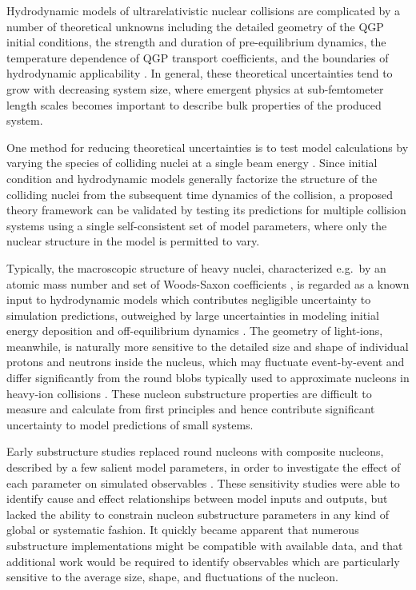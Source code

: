 \documentclass[aps,prc,reprint,amsmath,nofootinbib]{revtex4-1}
\begin{document}
Hydrodynamic models of ultrarelativistic nuclear collisions are complicated by a number of theoretical unknowns including the detailed geometry of the QGP initial conditions, the strength and duration of pre-equilibrium dynamics, the temperature dependence of QGP transport coefficients, and the boundaries of hydrodynamic applicability \cite{Niemi:2014lha, deSouza:2015ena, Ollitrault:2012cm, Song:2012ua}.
In general, these theoretical uncertainties tend to grow with decreasing system size, where emergent physics at sub-femtometer length scales becomes important to describe bulk properties of the produced system.

One method for reducing theoretical uncertainties is to test model calculations by varying the species of colliding nuclei at a single beam energy \cite{Adare:2015bua, Schenke:2014tga, Aidala:2018mcw, Adare:2017wlc, Adamczyk:2015obl, Shen:2016zpp, Aidala:2017ajz, Adare:2006ti}.
Since initial condition and hydrodynamic models generally factorize the structure of the colliding nuclei from the subsequent time dynamics of the collision, a proposed theory framework can be validated by testing its predictions for multiple collision systems using a single self-consistent set of model parameters, where only the nuclear structure in the model is permitted to vary.

Typically, the macroscopic structure of heavy nuclei, characterized e.g.\ by an atomic mass number and set of Woods-Saxon coefficients \cite{MOLLER1995185, DEVRIES1987495}, is regarded as a known input to hydrodynamic models which contributes negligible uncertainty to simulation predictions, outweighed by large uncertainties in modeling initial energy deposition and off-equilibrium dynamics \cite{Niemi:2014lha, Song:2011hk, Retinskaya:2013gca, Liu:2015nwa, Kurkela:2016vts}.
The geometry of light-ions, meanwhile, is naturally more sensitive to the detailed size and shape of individual protons and neutrons inside the nucleus, which may fluctuate event-by-event and differ significantly from the round blobs typically used to approximate nucleons in heavy-ion collisions \cite{Schenke:2014zha, Welsh:2016siu, Moreland:2017kdx, Schenke:2014gaa, Schlichting:2014ipa}.
These nucleon substructure properties are difficult to measure and calculate from first principles and hence contribute significant uncertainty to model predictions of small systems.

Early substructure studies replaced round nucleons with composite nucleons, described by a few salient model parameters, in order to investigate the effect of each parameter on simulated observables \cite{Adler:2013aqf, Mitchell:2016jio, Welsh:2016siu, Broniowski:2016pvx, Bozek:2017jog}.
These sensitivity studies were able to identify cause and effect relationships between model inputs and outputs, but lacked the ability to constrain nucleon substructure parameters in any kind of global or systematic fashion.
It quickly became apparent that numerous substructure implementations might be compatible with available data, and that additional work would be required to identify observables which are particularly sensitive to the average size, shape, and fluctuations of the nucleon.
\end{document}

